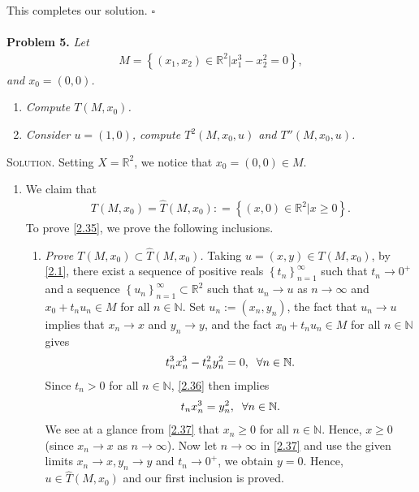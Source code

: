 \documentclass[a4paper]{article}
\numberwithin{equation}{section}
\begin{document}
This completes our solution. \hfill $\square$\\
\\
\textbf{Problem 5.} \textit{Let}
\begin{align}
M = \left\{ {\left( {{x_1},{x_2}} \right) \in {\mathbb{R}^2}|x_1^3 - x_2^2 = 0} \right\},
\end{align}
\textit{and $x_0=\left(0,0\right)$.}
\begin{enumerate}
\item \textit{Compute $T\left(M,x_0\right)$.}
\item \textit{Consider $u=\left(1,0\right)$, compute ${T^2}\left( {M,{x_0},u} \right)$ and $T''\left( {M,{x_0},u} \right)$.}
\end{enumerate}
\textsc{Solution.} Setting $X=\mathbb{R}^2$, we notice that $x_0=\left(0,0\right) \in M$.
\begin{enumerate}
\item We claim that
\begin{align}
\label{2.35}
T\left( {M,{x_0}} \right) = \widehat T\left( {M,{x_0}} \right): = \left\{ {\left( {x,0} \right) \in {\mathbb{R}^2}|x \ge 0} \right\}.
\end{align}
To prove \eqref{2.35}, we prove the following inclusions.
\begin{enumerate}
\item \textit{Prove $T\left( {M,{x_0}} \right) \subset \widehat T\left( {M,{x_0}} \right)$.} Taking $u=\left(x,y\right) \in T\left(M,x_0\right)$, by \eqref{2.1}, there exist a sequence of positive reals $\left\{ {{t_n}} \right\}_{n = 1}^\infty $ such that $t_n\to 0^+$ and a sequence $\left\{ {{u_n}} \right\}_{n = 1}^\infty  \subset {\mathbb{R}^2}$ such that $u_n\to u$ as $n\to \infty$ and $x_0+t_nu_n\in M$ for all $n\in \mathbb{N}$. Set $u_n:=\left(x_n,y_n\right)$, the fact that $u_n\to u$ implies that $x_n\to x$ and $y_n\to y$, and the fact $x_0+t_nu_n\in M$ for all $n\in \mathbb{N}$ gives
\begin{align}
\label{2.36}
t_n^3x_n^3 - t_n^2y_n^2 = 0,\hspace{0.2cm}\forall n \in \mathbb{N}.
\end{align}
Since $t_n>0$ for all $n\in \mathbb{N}$, \eqref{2.36} then implies 
\begin{align}
\label{2.37}
{t_n}x_n^3 = y_n^2 ,\hspace{0.2cm}\forall n \in \mathbb{N}.
\end{align}
We see at a glance from \eqref{2.37} that $x_n\ge 0$ for all $n\in \mathbb{N}$. Hence, $x\ge 0$ (since $x_n\to x$ as $n\to \infty$). Now let $n\to \infty$ in \eqref{2.37} and use the given limits $x_n\to x,y_n\to y$ and $t_n\to 0^+$, we obtain $y=0$. Hence, $u\in \widehat{T}\left(M,x_0\right)$ and our first inclusion is proved.

\end{enumerate}
\end{enumerate}
\end{document}
